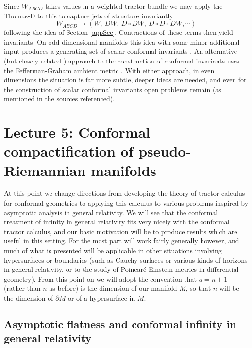 \documentclass[a4paper,12pt]{amsart}
\theoremstyle{remark}
\begin{document}
Since $W_{ABCD}$ takes values in a weighted tractor bundle we may
apply the Thomas-D to this to capture jets of structure invariantly 
$$
W_{ABCD} \mapsto (W,~D W,~D\circ D W, ~D\circ D\circ D W, \cdots ) 
$$ following the idea of Section \ref{appSec}.  Contractions of these
terms then yield invariants. On odd dimensional manifolds this idea
with some minor additional input produces a generating set of scalar
conformal invariants \cite{Go-Adv}.  An alternative (but closely
related \cite{CapGoamb}) approach to the construction of conformal
invariants uses the Fefferman-Graham ambient metric
\cite{BEGr,FGbook}. With either approach, in even dimensions the
situation is far more subtle, deeper ideas are needed, and even for
the construction of scalar conformal invariants open problems remain (as
mentioned in the sources referenced).
















\section{Lecture 5: Conformal compactification of pseudo-Riemannian 
manifolds}\label{compS}

At this point we change directions from developing the theory of tractor calculus for conformal geometries to applying this calculus to various problems inspired by asymptotic analysis in general relativity. We will see that the conformal treatment of infinity in general relativity fits very nicely with the conformal tractor calculus, and our basic motivation will be to produce results which are useful in this setting. For the most part will work fairly generally however, and much of what is presented will be applicable in other situations involving hypersurfaces or boundaries (such as Cauchy surfaces or various kinds of horizons in general relativity, or to the study of Poincar\'e-Einstein metrics in differential geometry). From this point on we will adopt the convention that $d=n+1$ (rather than $n$ as before) is the dimension of our manifold $M$, so that $n$ will be the dimension of $\partial M$ or of a hypersurface in $M$. 

\subsection{Asymptotic flatness and conformal infinity in general relativity}
\end{document}
